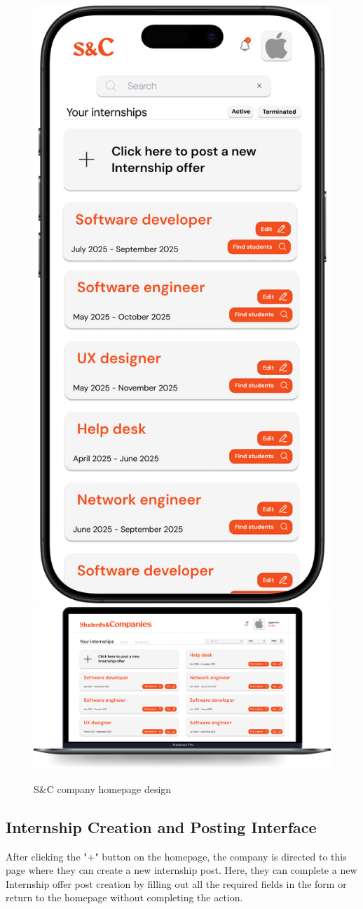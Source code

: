 \begin{figure}[H]
    \centering
    \includegraphics[width=0.2\linewidth]{Images/Mock-up/mobile homepage company.png}
    \includegraphics[width=0.75\linewidth]{Images/Mock-up/homepage company.png}
    \caption{S\&C company homepage design}
    \label{fig:homepage-design}
\end{figure}

\subsection{Internship Creation and Posting Interface}

After clicking the "+" button on the homepage, the company is directed to this page where they can create a new internship post. Here, they can complete a new Internship offer post creation by filling out all the required fields in the form or return to the homepage without completing the action. \\

